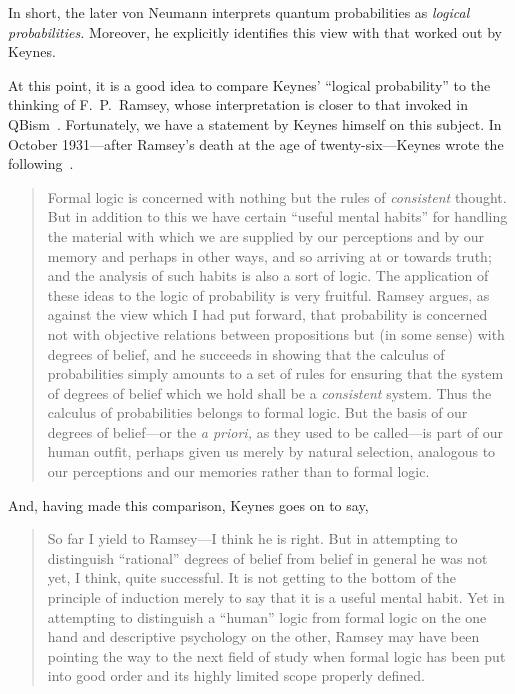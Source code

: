 \documentclass[aps,pra,superscriptaddress,12pt,tightenlines,nofootinbib]{revtex4-2}
\begin{document}
In short, the later von Neumann interprets quantum probabilities as
\emph{logical probabilities.}  Moreover, he explicitly identifies this
view with that worked out by Keynes.

At this point, it is a good idea to compare Keynes' ``logical
probability'' to the thinking of F.\ P.\ Ramsey, whose interpretation
is closer to that invoked in QBism~\cite[pp.\ ix, 1225--29,
  1374]{Fuchs2014}.  Fortunately, we have a statement by Keynes
himself on this subject.  In October 1931---after Ramsey's death at
the age of twenty-six---Keynes wrote the following~\cite{Keynes1931}.
\begin{quotation}
Formal logic is concerned with nothing but the rules of
\emph{consistent} thought.  But in addition to this we have certain
``useful mental habits'' for handling the material with which we are
supplied by our perceptions and by our memory and perhaps in other
ways, and so arriving at or towards truth; and the analysis of such
habits is also a sort of logic.  The application of these ideas to the
logic of probability is very fruitful.  Ramsey argues, as against the
view which I had put forward, that probability is concerned not with
objective relations between propositions but (in some sense) with
degrees of belief, and he succeeds in showing that the calculus of
probabilities simply amounts to a set of rules for ensuring that the
system of degrees of belief which we hold shall be a \emph{consistent}
system.  Thus the calculus of probabilities belongs to formal logic.
But the basis of our degrees of belief---or the \emph{a priori,} as
they used to be called---is part of our human outfit, perhaps given us
merely by natural selection, analogous to our perceptions and our
memories rather than to formal logic.
\end{quotation}
And, having made this comparison, Keynes goes on to say,
\begin{quotation}
\noindent So far I yield to Ramsey---I think he is right.  But in
attempting to distinguish ``rational'' degrees of belief from belief
in general he was not yet, I think, quite successful.  It is not
getting to the bottom of the principle of induction merely to say that
it is a useful mental habit.  Yet in attempting to distinguish a
``human'' logic from formal logic on the one hand and descriptive
psychology on the other, Ramsey may have been pointing the way to the
next field of study when formal logic has been put into good order and
its highly limited scope properly defined.
\end{quotation}
\end{document}
